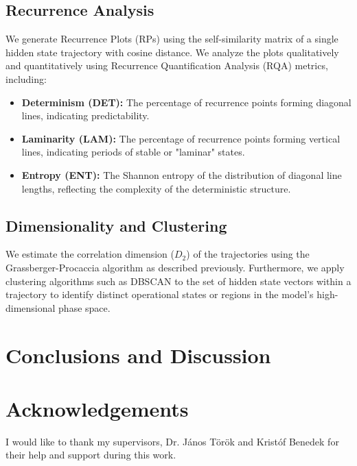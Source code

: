 \documentclass[a4paper,12pt]{article}
\begin{document}
\subsection{Recurrence Analysis}
We generate Recurrence Plots (RPs) using the self-similarity matrix of a single hidden state trajectory with cosine distance. We analyze the plots qualitatively and quantitatively using Recurrence Quantification Analysis (RQA) metrics, including:
\begin{itemize}
    \item \textbf{Determinism (DET):} The percentage of recurrence points forming diagonal lines, indicating predictability.
    \item \textbf{Laminarity (LAM):} The percentage of recurrence points forming vertical lines, indicating periods of stable or "laminar" states.
    \item \textbf{Entropy (ENT):} The Shannon entropy of the distribution of diagonal line lengths, reflecting the complexity of the deterministic structure.
\end{itemize}

\subsection{Dimensionality and Clustering}
We estimate the correlation dimension ($D_2$) of the trajectories using the Grassberger-Procaccia algorithm as described previously. Furthermore, we apply clustering algorithms such as DBSCAN to the set of hidden state vectors within a trajectory to identify distinct operational states or regions in the model's high-dimensional phase space.



\section{Conclusions and Discussion}




\section{Acknowledgements }

I would like to thank my supervisors, Dr. János Török and Kristóf Benedek for their help and support during this work.

\newpage


\end{document}
